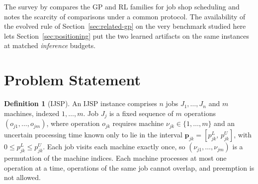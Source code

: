 \documentclass[preprint,authoryear,12pt]{elsarticle}
\theoremstyle{definition}
\newtheorem{definition}{Definition}
\theoremstyle{remark}
\begin{document}
The survey by \citet{Xu2025} compares the GP and RL families for job
shop scheduling and notes the scarcity of comparisons under a common
protocol. The availability of the evolved rule of
Section~\ref{sec:related-gp} on the very benchmark studied here lets
Section~\ref{sec:positioning} put the two learned artifacts on the
same instances at matched \emph{inference} budgets.

\section{Problem Statement}
\label{sec:problem}

\begin{definition}[IJSP]
An IJSP instance comprises $n$ jobs $J_1,\dots,J_n$ and $m$ machines,
indexed $1,\dots,m$.
Job $J_j$ is a fixed sequence of $m$ operations
$(o_{j1},\dots,o_{jm})$, where operation $o_{jk}$ requires machine
$\nu_{jk}\in\{1,\dots,m\}$ and an uncertain processing time known
only to lie in the interval
$\mathbf{p}_{jk}=[p^{L}_{jk},\,p^{U}_{jk}]$, with $0\le p^L_{jk}\le
p^U_{jk}$. Each job visits each machine exactly once, so
$(\nu_{j1},\dots,\nu_{jm})$ is a permutation of the machine indices.
Each machine processes at most one operation at a time, operations of
the same job cannot overlap, and preemption is not allowed.
\end{definition}
\end{document}
